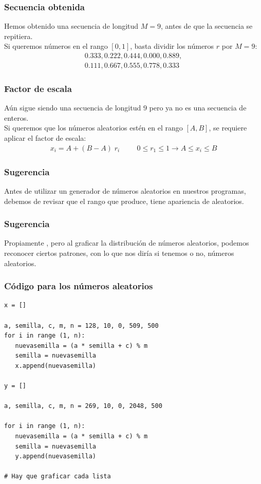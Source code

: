\documentclass[12pt]{beamer}
\begin{document}
\begin{frame}
\frametitle{Secuencia obtenida}
Hemos obtenido una secuencia de longitud $M = 9$, antes de que la secuencia se repitiera.
\\
\bigskip
\pause
Si queremos números en el rango $[0, 1]$, basta dividir los números $r$ por $M = 9$:
\pause
\begin{align*}
0.333, 0.222, 0.444, 0.000, 0.889, \\
0.111, 0.667, 0.555, 0.778, 0.333
\end{align*}
\end{frame}
\begin{frame}
\frametitle{Factor de escala}
Aún sigue siendo una secuencia de longitud $9$ pero ya no es una secuencia de enteros.
\\
\bigskip
\pause
Si queremos que los números aleatorios estén en el rango $[A, B]$, se requiere aplicar el factor de escala:
\pause
\begin{align*}
x_{i} = A + (B - A) \; r_{i} \hspace{1cm} 0 \leq r_{1} \leq 1 \rightarrow A \leq x_{i} \leq B
\end{align*}
\end{frame}
\begin{frame}
\frametitle{Sugerencia}
Antes de utilizar un generador de números aleatorios en nuestros programas, debemos de revisar que el rango que produce, tiene apariencia de aleatorios.
\end{frame}
\begin{frame}
\frametitle{Sugerencia}
Propiamente , \pause pero al graficar la distribución de números aleatorios, podemos reconocer ciertos patrones, con lo que nos diría si tenemos o no, números aleatorios.
\end{frame}
\begin{frame}
\frametitle{Código para los números aleatorios}
\begin{lstlisting}[caption=Código para generar un conjunto de números aleatorios]
x = []

a, semilla, c, m, n = 128, 10, 0, 509, 500
for i in range (1, n):
   nuevasemilla = (a * semilla + c) % m
   semilla = nuevasemilla
   x.append(nuevasemilla)

y = []

a, semilla, c, m, n = 269, 10, 0, 2048, 500

for i in range (1, n):
   nuevasemilla = (a * semilla + c) % m
   semilla = nuevasemilla
   y.append(nuevasemilla)

# Hay que graficar cada lista
\end{lstlisting}
\end{frame}
\end{document}
